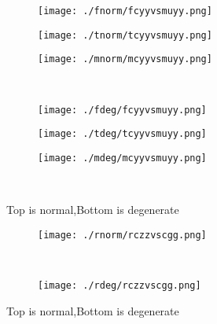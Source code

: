 \documentclass[aps,floats,floatfix,nofootinbib]{revtex4-1}
\begin{document}
\begin{center}
\begin{figure}
\begin{subfigure}{0.3\textwidth}
\texttt{[image: ./fnorm/fcyyvsmuyy.png]}
\label{}
\end{subfigure}
\begin{subfigure}{0.3\textwidth}
\texttt{[image: ./tnorm/tcyyvsmuyy.png]}
\label{}
\end{subfigure}
\begin{subfigure}{0.3\textwidth}
\texttt{[image: ./mnorm/mcyyvsmuyy.png]}
\label{}
\end{subfigure}\\
\begin{subfigure}{0.3\textwidth}
\texttt{[image: ./fdeg/fcyyvsmuyy.png]}
\label{}
\end{subfigure}
\begin{subfigure}{0.3\textwidth}
\texttt{[image: ./tdeg/tcyyvsmuyy.png]}
\label{}
\end{subfigure}
\begin{subfigure}{0.3\textwidth}
\texttt{[image: ./mdeg/mcyyvsmuyy.png]}
\label{}
\end{subfigure}\\
\caption{Top is normal,Bottom is degenerate}
\end{figure}
\end{center}

\begin{center}
\begin{figure}
\begin{subfigure}{0.95\textwidth}
\texttt{[image: ./rnorm/rczzvscgg.png]}
\label{}
\end{subfigure}\\
\begin{subfigure}{0.95\textwidth}
\texttt{[image: ./rdeg/rczzvscgg.png]}
\label{}
\end{subfigure}
\caption{Top is normal,Bottom is degenerate}
\end{figure}
\end{center}
\end{document}
